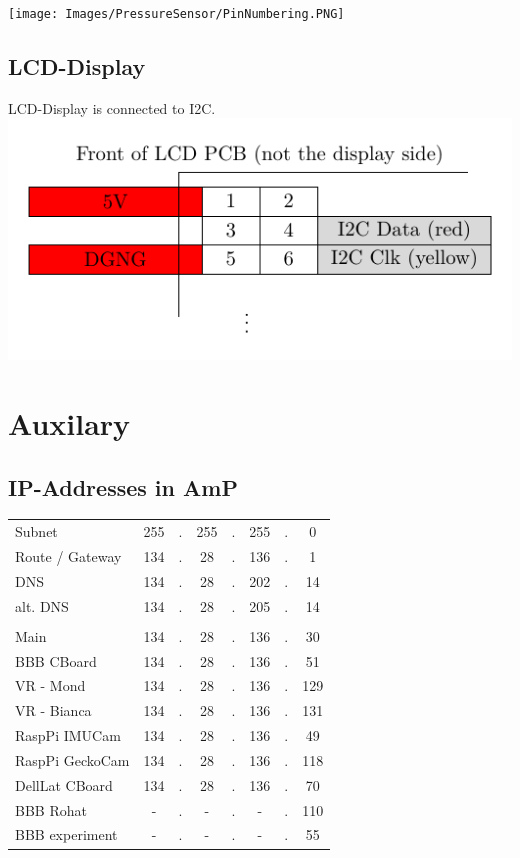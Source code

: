 \documentclass[
	fontsize=10pt
	paper=a4
]{scrartcl}
\begin{document}
\texttt{[image: Images/PressureSensor/PinNumbering.PNG]}



\subsection{LCD-Display}

LCD-Display is connected to I2C.
\includegraphics[scale=1]{Images/LCDDisplay/LCDPins.pdf}



\section{Auxilary}


\subsection{IP-Addresses in AmP}
\begin{tabular}{l|ccccccc}
Subnet 		& 255 &.& 255 &.& 255 &.& 0 \\
Route / Gateway 	& 134 &.& 28  &.& 136 &.& 1 \\
DNS	 	& 134 &.& 28  &.& 202 &.& 14 \\
alt. DNS 	& 134 &.& 28  &.& 205 &.& 14 \\ \hline
\\
Main	 	& 134 &.& 28  &.& 136 &.& 30 \\
BBB CBoard 	& 134 &.& 28  &.& 136 &.& 51 \\
VR - Mond 	& 134 &.& 28  &.& 136 &.& 129 \\
VR - Bianca	& 134 &.& 28  &.& 136 &.& 131 \\
RaspPi IMUCam 	& 134 &.& 28  &.& 136 &.& 49 \\
RaspPi GeckoCam	& 134 &.& 28  &.& 136 &.& 118 \\
DellLat CBoard 	& 134 &.& 28  &.& 136 &.& 70 \\
BBB Rohat 	& - &.& -  &.& - &.& 110 \\
BBB experiment 	& - &.& -  &.& - &.& 55 \\

\end{tabular}
\end{document}
